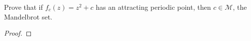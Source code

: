 \begin{problem}{8}
  Prove that if $f_c(z) = z^2 + c$ has an attracting periodic point, then $c \in \mathcal{M}$, the
  Mandelbrot set.
\end{problem}

\begin{proof}
\end{proof}
\newpage
